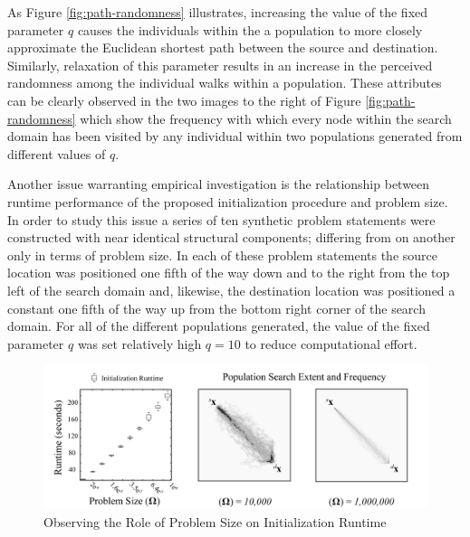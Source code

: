 As Figure \ref{fig:path-randomness} illustrates, increasing the value of the fixed parameter $q$ causes the individuals within the a population to more closely approximate the Euclidean shortest path between the source and destination. Similarly, relaxation of this parameter results in an increase in the perceived randomness among the individual walks within a population. These attributes can be clearly observed in the two images to the right of Figure \ref{fig:path-randomness} which show the frequency with which every node within the search domain has been visited by any individual within two populations generated from different values of $q$.
            
Another issue warranting empirical investigation is the relationship between runtime performance of the proposed initialization procedure and problem size. In order to study this issue a series of ten synthetic problem statements were constructed with near identical structural components; differing from on another only in terms of problem size. In each of these problem statements the source location was positioned one fifth of the way down and to the right from the top left of the search domain and, likewise, the destination location was positioned a constant one fifth of the way up from the bottom right corner of the search domain. For all of the different populations generated, the value of the fixed parameter $q$ was set relatively high $q = 10$ to reduce computational effort.
            
            \begin{figure}[!h]
            \centering
            \includegraphics[width=5.5in]{figures/problem-size-study.png}
            \caption[Observing the Role of Problem Size on Initialization Runtime]{Observing the Role of Problem Size on Initialization Runtime}
            \label{fig:problem-size}
            \end{figure}
            
